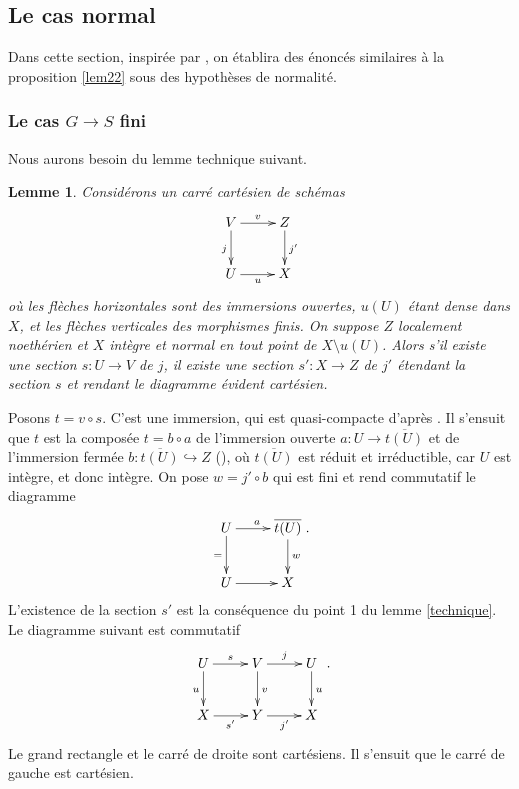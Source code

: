\documentclass[11pt]{amsart}
\numberwithin{equation}{section}
\newtheorem{lem}[thm]{Lemme}
\theoremstyle{definition}
\theoremstyle{remark}
\begin{document}
\subsection{Le cas normal}
\label{Normal}
Dans cette section, inspir\'ee par \cite[Chapter II]{Nor2}, on \'etablira des \'enonc\'es similaires \`a la proposition \ref{lem22} sous des hypoth\`eses de normalit\'e.



\subsubsection{Le cas $G \to S$ fini}
\label{sezFINI}


Nous aurons besoin du lemme technique suivant.

\begin{lem}\label{technique2} Consid\'erons un carr\'e cart\'esien de sch\'emas
$$\xymatrix{
V \ar[r]^v \ar[d]_j &Z \ar[d]^{j'} \\
U \ar[r]_u &X\\
}$$
o\`u les fl\`eches horizontales sont des immersions ouvertes, $u(U)$ \'etant dense dans $X$, et les fl\`eches verticales des morphismes finis. On suppose $Z$ localement noeth\'erien et $X$ int\`egre et normal en tout point de $X \setminus u(U)$. Alors s'il existe une section $s:U \to V$ de $j$, il existe une section $s': X \to Z$ de $j'$ \'etendant la section $s$ et rendant le diagramme \'evident cart\'esien.
\end{lem}

\proof Posons $t=v \circ s$. C'est une immersion, qui est quasi-compacte d'apr\`es \cite[Lemma 27.5.3, Tag 01OX]{ST}. Il s'ensuit que $t$ est la compos\'ee $t=b\circ a$ de l'immersion ouverte $a: U \to \overline{t(U)}$ et de l'immersion ferm\'ee $b: \overline{t(U)} \hookrightarrow Z$ (\cite[Lemma 28.3.2, Tag 01QV]{ST}), o\`u $\overline{t(U)}$ est r\'eduit et irr\'eductible, car $U$ est int\`egre, et donc int\`egre. On pose $w=j' \circ b$ qui est fini et rend commutatif le diagramme
$$\xymatrix{
U \ar[r]^a \ar[d]_= & \overline {t(U)}\ar[d]^w \\
U \ar[r] &X\\
}.$$ L'existence de la section $s'$ est la cons\'equence du point 1 du lemme \ref{technique}. Le diagramme suivant est commutatif
$$\xymatrix{
U \ar[r]^s \ar[d]_u & V \ar[r]^j \ar[d]^v &U \ar[d]^u\\
X \ar[r]_{s'} & Y \ar[r]_{j'} &X\\
}.$$ Le grand rectangle et le carr\'e de droite sont cart\'esiens. Il s'ensuit que le carr\'e de gauche est cart\'esien.
\endproof
\end{document}
